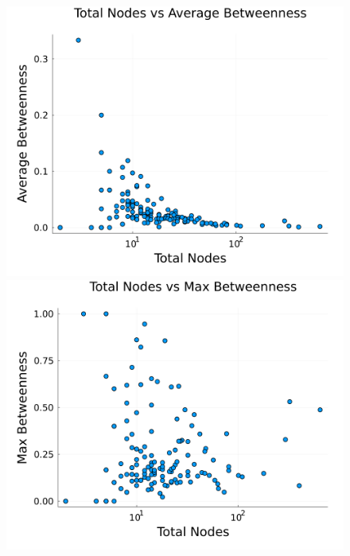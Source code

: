  
\begin{figure}[H]
    \centering
    \begin{minipage}{0.5\textwidth}
        \centering
        \includegraphics[width=1\linewidth]{images/task44/TotalNodesVsAverageBetweenness.png}
    \end{minipage}%
    \begin{minipage}{0.5\textwidth}
        \centering
        \includegraphics[width=1\linewidth]{images/task44/TotalNodesVsMaxBetweenness.png}
    \end{minipage}
    \caption{}
    \label{fig:TotalNodesVsMaxBetweenness}
    \label{fig:TotalNodesVsAverageBetweenness}
\end{figure}


